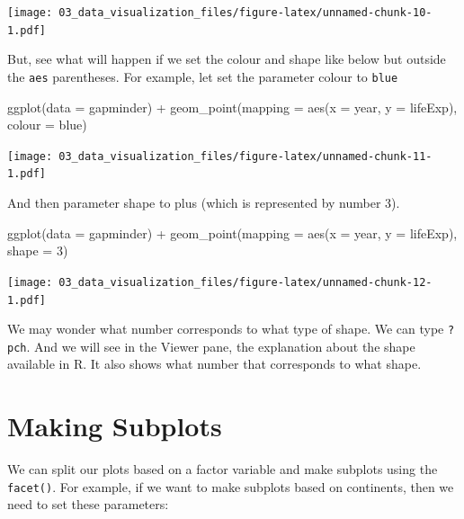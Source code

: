 \documentclass[
  10pt,
]{krantz}
\newenvironment{Shaded}{\begin{snugshade}}{\end{snugshade}}
\newcommand{\AttributeTok}[1]{\textcolor[rgb]{0.77,0.63,0.00}{#1}}
\newcommand{\DecValTok}[1]{\textcolor[rgb]{0.00,0.00,0.81}{#1}}
\newcommand{\FunctionTok}[1]{\textcolor[rgb]{0.00,0.00,0.00}{#1}}
\newcommand{\NormalTok}[1]{#1}
\newcommand{\SpecialCharTok}[1]{\textcolor[rgb]{0.00,0.00,0.00}{#1}}
\newcommand{\StringTok}[1]{\textcolor[rgb]{0.31,0.60,0.02}{#1}}
\begin{document}
\texttt{[image: 03\_data\_visualization\_files/figure-latex/unnamed-chunk-10-1.pdf]}

But, see what will happen if we set the colour and shape like below but outside the \texttt{aes} parentheses. For example, let set the parameter colour to \texttt{blue}

\begin{Shaded}
\begin{Highlighting}[]
\FunctionTok{ggplot}\NormalTok{(}\AttributeTok{data =}\NormalTok{ gapminder) }\SpecialCharTok{+}
  \FunctionTok{geom\_point}\NormalTok{(}\AttributeTok{mapping =} \FunctionTok{aes}\NormalTok{(}\AttributeTok{x =}\NormalTok{ year, }\AttributeTok{y =}\NormalTok{ lifeExp), }
             \AttributeTok{colour =} \StringTok{\textquotesingle{}blue\textquotesingle{}}\NormalTok{)}
\end{Highlighting}
\end{Shaded}

\texttt{[image: 03\_data\_visualization\_files/figure-latex/unnamed-chunk-11-1.pdf]}

And then parameter shape to plus (which is represented by number 3).

\begin{Shaded}
\begin{Highlighting}[]
\FunctionTok{ggplot}\NormalTok{(}\AttributeTok{data =}\NormalTok{ gapminder) }\SpecialCharTok{+}
  \FunctionTok{geom\_point}\NormalTok{(}\AttributeTok{mapping =} \FunctionTok{aes}\NormalTok{(}\AttributeTok{x =}\NormalTok{ year, }\AttributeTok{y =}\NormalTok{ lifeExp), }
             \AttributeTok{shape =} \DecValTok{3}\NormalTok{)}
\end{Highlighting}
\end{Shaded}

\texttt{[image: 03\_data\_visualization\_files/figure-latex/unnamed-chunk-12-1.pdf]}

We may wonder what number corresponds to what type of shape. We can type \texttt{?pch}. And we will see in the Viewer pane, the explanation about the shape available in R. It also shows what number that corresponds to what shape.

\hypertarget{making-subplots}{%
\section{Making Subplots}\label{making-subplots}}

We can split our plots based on a factor variable and make subplots using the \texttt{facet()}. For example, if we want to make subplots based on continents, then we need to set these parameters:
\end{document}
